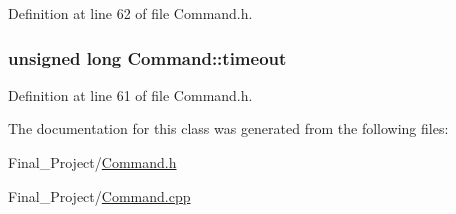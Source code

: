 Definition at line 62 of file Command.\-h.

\hypertarget{classCommand_a687b30a3d41c93f91dfba5a88c98f270}{
\subsubsection[{timeout}]{\setlength{\rightskip}{0pt plus 5cm}unsigned long Command\-::timeout\hspace{0.3cm}{\ttfamily [private]}}}\label{classCommand_a687b30a3d41c93f91dfba5a88c98f270}


Definition at line 61 of file Command.\-h.



The documentation for this class was generated from the following files\-:\begin{DoxyCompactItemize}
\item 
Final\-\_\-\-Project/\hyperlink{Command_8h}{Command.\-h}\item 
Final\-\_\-\-Project/\hyperlink{Command_8cpp}{Command.\-cpp}\end{DoxyCompactItemize}
